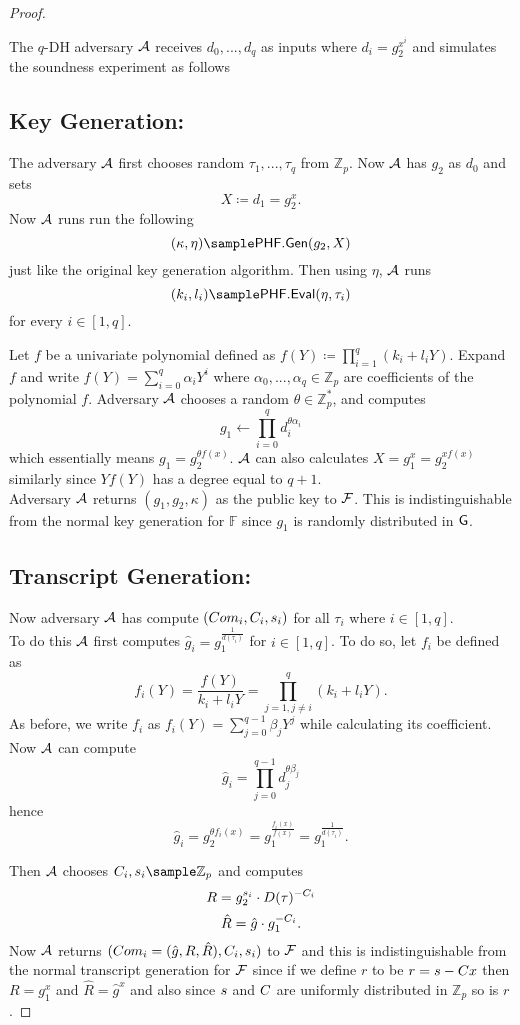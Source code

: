 \begin{proof}
\begin{figure}[htb!]
{\begin{minipage}[t]{0.7\textwidth}
\begin{nicodemus}
            
            \end{nicodemus}
        \end{minipage}
    }
    \caption{}
    \label{fig:x-soundess}
\end{figure}

The $q$-DH adversary $\mathcal{A}$ receives $d_0,...,d_q$ as inputs where $d_i = g_2^{x^i}$ and simulates the soundness experiment as follows
\subsection*{Key Generation:} The adversary $\mathcal{A}$ first chooses random $\tau_1,...,\tau_q$ from $\mathbb{Z}_p$. 
Now $\mathcal{A}$ has $g_2$ as $d_0$ and sets 
$$X \coloneqq d_1 = g_2^x.$$
Now $\mathcal{A}$ runs run the following 
$$(\kappa, \eta)\sample \phfGen(g_2,X)$$
just like the original key generation algorithm. Then using $\eta$, $\mathcal{A}$ runs 
$$(k_i,l_i) \sample \phfEval(\eta,\tau_i)$$
for every $i \in [1,q]$.

Let $f$ be a univariate polynomial defined as 
$f(Y) \coloneqq \prod_{i=1}^q (k_i + l_iY)$. Expand $f$ and write $f(Y) = \sum_{i=0}^q \alpha_i Y^i$ where
$\alpha_0,...,\alpha_q \in \mathbb{Z}_p$ are coefficients of the polynomial $f$. Adversary $\mathcal{A}$ chooses a random $\theta \in \mathbb{Z}^*_p$, and computes
$$g_1 \leftarrow \prod_{i=0}^q d_i^{\theta\alpha_i}$$
which essentially means $g_1 = g_2^{\theta f(x)}$. $\mathcal{A}$ can also calculates 
$X = g_1^x = g_2^{xf(x)}$ similarly since $Yf(Y)$ has a degree equal to $q+1$.
\\
Adversary $\mathcal{A}$ returns $(g_1,g_2,\kappa)$ as the public key to $\mathcal{F}$. This is indistinguishable from the normal key generation for $\mathbb{F}$ since $g_1$ is randomly distributed in $\mathsf{G}$.

\subsection*{Transcript Generation:}
Now adversary $\mathcal{A}$ has compute $(Com_i,C_i,s_i)$ for all $\tau_i$ where $i \in [1,q]$.
\\
To do this $\mathcal{A}$ first computes
$\hat{g}_i = g_1^{\frac{1}{d(\tau_i)}}$ for $i \in [1,q]$. To do so, let $f_i$ be defined as
$$f_i(Y) = \frac{f(Y)}{k_i+l_iY} = \prod_{j=1, j \neq i}^q (k_i + l_iY).$$
As before, we write $f_i$ as 
$f_i(Y) = \sum_{j=0}^{q-1} \beta_jY^j$ while calculating its coefficient.  Now $\mathcal{A}$ can compute
$$\hat{g}_i = \prod_{j=0}^{q-1} d_j^{\theta\beta_j}$$
hence
$$\hat{g}_i = g_2^{\theta f_i(x)} = g_1^{\frac{ f_i(x)}{f(x)}}=   g_1^{\frac{1}{d(\tau_i)}}.$$

 Then $\mathcal{A}$ chooses  $\c_i,\s_i\sample\mathbb{Z}_p$ and computes
$$R = g_2^{s_i} \cdot D(\tau)^{-C_i}$$
$$ \hat{R} = \hat{g}\cdot g_1^{-C_i}.$$
Now $\mathcal{A}$ returns $(Com_i = (\hat{g},R,\hat{R}),C_i,s_i)$ to $\mathcal{F}$ and this is indistinguishable from the normal transcript generation for $\mathcal{F}$ since if we define $r$ to be $r = s-C x$ then $R = g_1^x$ and 
$\hat{R} = \hat{g}^x$ and also since $s$ and $C$ are uniformly distributed in $\mathbb{Z}_p$ so is $r$.
\end{proof}

